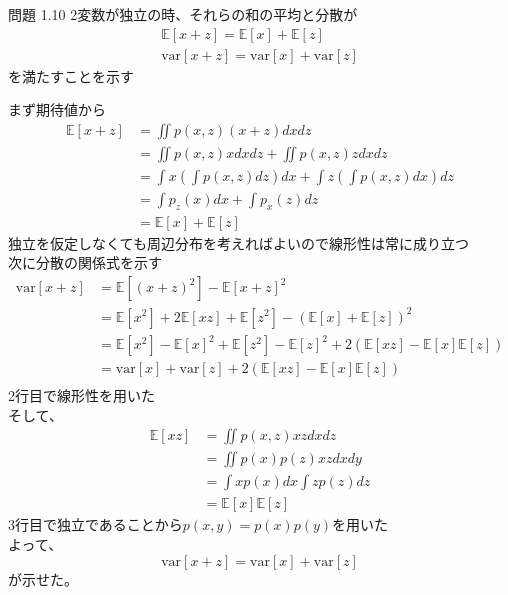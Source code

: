 \documentclass[a4j,dvipdfmx]{jsarticle}
\newcommand{\E}{\mathbb{E}}
\newcommand{\var}{\mathrm{var}}
\begin{document}
\newpage
\begin{itembox}[l]{問題 1.10}
    2変数が独立の時、それらの和の平均と分散が
    \begin{gather*}
        \E[x+z] = \E[x] + \E[z] \\
        \var[x+z] = \var[x] + \var[z]
    \end{gather*}
    を満たすことを示す
\end{itembox}
まず期待値から
\begin{align*}
    \E[x+z] &= \iint p(x,z) (x+z) dx dz \\
    &= \iint p(x,z)x dx dz + \iint p(x,z)z dx dz \\
    &= \int x \left( \int p(x,z) dz \right) dx + \int z \left( \int p(x,z) dx \right) dz \\
    &= \int p_z(x) dx + \int p_x(z) dz \\
    &= \E[x] + \E[z]
\end{align*}
独立を仮定しなくても周辺分布を考えればよいので線形性は常に成り立つ \\
次に分散の関係式を示す
\begin{align*}
    \var[x+z] &= \E[(x+z)^2] - \E[x+z]^2 \\
    &= \E[x^2] + 2\E[xz] + \E[z^2] - (\E[x] + \E[z])^2 \\
    &= \E[x^2] - \E[x]^2 + \E[z^2] - \E[z]^2 + 2(\E[xz] - \E[x]\E[z]) \\
    &= \var[x] + \var[z] + 2(\E[xz] - \E[x]\E[z]) \\
\end{align*}
2行目で線形性を用いた\\
そして、
\begin{align*}
    \E[xz] &= \iint p(x,z) xz dx dz \\
    &= \iint p(x)p(z) xz dx dy \\
    &= \int xp(x) dx \int zp(z) dz \\
    &= \E[x]\E[z]
\end{align*}
3行目で独立であることから$p(x,y)=p(x)p(y)$を用いた\\
よって、
\begin{equation*}
    \var[x+z] = \var[x] + \var[z]
\end{equation*}
が示せた。
\end{document}
